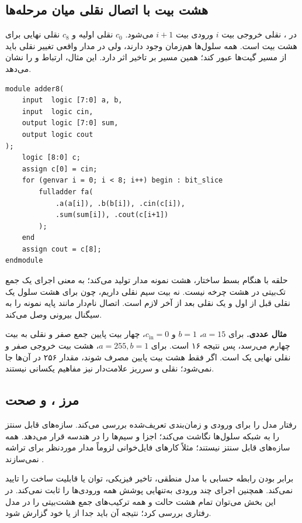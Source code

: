 \subsection{هشت بیت با اتصال نقلی میان مرحله‌ها}
در ، نقلی خروجی بیت \(i\) ورودی بیت \(i+1\) می‌شود.
\(c_0\) نقلی اولیه و \(c_8\) نقلی نهایی برای هشت بیت است.
همه سلول‌ها هم‌زمان وجود دارند، ولی در مدار واقعی تغییر نقلی باید از مسیر گیت‌ها عبور کند؛
همین مسیر بر تاخیر اثر دارد. این مثال، ارتباط  و  را نشان می‌دهد.

\begin{latin}
\small
\begin{verbatim}
module adder8(
    input  logic [7:0] a, b,
    input  logic cin,
    output logic [7:0] sum,
    output logic cout
);
    logic [8:0] c;
    assign c[0] = cin;
    for (genvar i = 0; i < 8; i++) begin : bit_slice
        fulladder fa(
            .a(a[i]), .b(b[i]), .cin(c[i]),
            .sum(sum[i]), .cout(c[i+1])
        );
    end
    assign cout = c[8];
endmodule
\end{verbatim}
\end{latin}
حلقه با  هنگام بسط ساختار، هشت نمونه مدار تولید می‌کند؛
به معنی اجرای یک جمع تک‌بیتی در هشت چرخه نیست.
نه بیت سیم نقلی داریم، چون برای هشت سلول یک نقلی قبل از اول و یک نقلی بعد از آخر لازم است.
اتصال نام‌دار مانند  پایه نمونه را به سیگنال بیرونی وصل می‌کند.

\textbf{مثال عددی.} برای \(a=15\)، \(b=1\) و \(c_{\mathrm{in}}=0\)،
چهار بیت پایین جمع صفر و نقلی به بیت چهارم می‌رسد، پس نتیجه ۱۶ است.
برای \(a=255,b=1\)، هشت بیت خروجی صفر و نقلی نهایی یک است.
اگر فقط هشت بیت پایین مصرف شوند، مقدار ۲۵۶ در آن‌ها جا نمی‌شود؛
نقلی و سرریز علامت‌دار نیز مفاهیم یکسانی نیستند.

\subsection{مرز ،  و صحت}
 رفتار مدل را برای ورودی و زمان‌بندی تعریف‌شده بررسی می‌کند.
 سازه‌های قابل سنتز را به شبکه سلول‌ها نگاشت می‌کند؛
 اجزا و سیم‌ها را در هندسه قرار می‌دهد.
همه سازه‌های  قابل سنتز نیستند؛ مثلاً کارهای فایل‌خوانی
 لزوماً مدار موردنظر برای تراشه نمی‌سازند
\cite[صفحه چاپی ۴۱]{weste}.

برابر بودن رابطه حسابی با مدل منطقی، تاخیر فیزیکی، توان یا قابلیت ساخت را
تایید نمی‌کند. همچنین اجرای چند ورودی به‌تنهایی پوشش همه ورودی‌ها را ثابت نمی‌کند.
در این بخش می‌توان تمام هشت حالت  و همه ترکیب‌های جمع هشت‌بیتی
را در مدل رفتاری بررسی کرد؛ نتیجه آن باید جدا از  یا  خود  گزارش شود.

